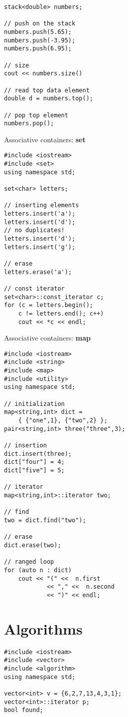 \documentclass[10pt]{article}
\begin{document}
\begin{multicols*}{3}
\begin{lstlisting}
stack<double> numbers;

// push on the stack
numbers.push(5.65);
numbers.push(-3.95);
numbers.push(6.95);

// size
cout << numbers.size()

// read top data element
double d = numbers.top();

// pop top element
numbers.pop();
\end{lstlisting}
Associative containers: \textbf{set}
\lstset {language=C++}
\begin{lstlisting}
#include <iostream>
#include <set>
using namespace std;

set<char> letters;

// inserting elements    
letters.insert('a');
letters.insert('d');
// no duplicates!
letters.insert('d');
letters.insert('g');

// erase    
letters.erase('a');

// const iterator 
set<char>::const_iterator c;   
for (c = letters.begin();
    c != letters.end(); c++)
    cout << *c << endl;
\end{lstlisting}
Associative containers: \textbf{map}
\lstset {language=C++}
\begin{lstlisting}
#include <iostream>
#include <string>
#include <map>
#include <utility>
using namespace std;

// initialization
map<string,int> dict = 
    { {"one",1}, {"two",2} };
pair<string,int> three("three",3);

// insertion    
dict.insert(three);
dict["four"] = 4;
dict["five"] = 5;

// iterator    
map<string,int>::iterator two;

// find    
two = dict.find("two");

// erase    
dict.erase(two);

// ranged loop
for (auto n : dict)
    cout << "(" <<  n.first
            << "," <<  n.second 
            << ")" << endl;
\end{lstlisting}
%
%
\section*{Algorithms}
\small
\lstset {language=C++}
\begin{lstlisting}
#include <iostream>
#include <vector>
#include <algorithm>
using namespace std;

vector<int> v = {6,2,7,13,4,3,1};
vector<int>::iterator p;
bool found;


\end{lstlisting}
\end{multicols*}
\end{document}
